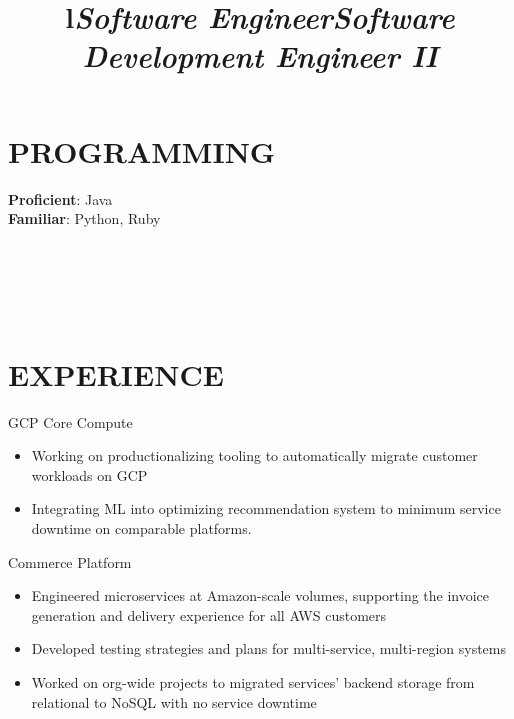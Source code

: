\documentclass[margin,11pt]{res}
\begin{document}
\begin{resume}
\section{PROGRAMMING}

\textbf{Proficient}: Java\\
\textbf{Familiar}: Python, Ruby\\

\begin{format}
\\
\title{l}\\
\body\\
\end{format}

\section{EXPERIENCE}
\title{\sl{Software Engineer}}
\begin{position}
GCP Core Compute\\
\begin{itemize}
\item Working on productionalizing tooling to automatically migrate customer workloads on GCP
\item Integrating ML into optimizing recommendation system to minimum service downtime on comparable platforms.
\end{itemize}
\end{position}

\vspace{\baselineskip}

\title{\sl{Software Development Engineer II}}
\begin{position}
Commerce Platform\\
\begin{itemize}
\item Engineered microservices at Amazon-scale volumes, supporting the invoice generation and delivery experience for all AWS customers
\item Developed testing strategies and plans for multi-service, multi-region systems
\item Worked on org-wide projects to migrated services' backend storage from relational to NoSQL with no service downtime
\end{itemize}
\end{position}


\end{resume}
\end{document}
